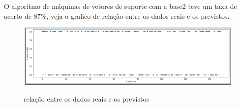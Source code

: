 O algoritmo de máquinas de vetores de suporte com a base2 teve um taxa de acerto de 87\%, veja o grafico de relação entre os dados reais e os previstos.
\begin{figure}[htbp]
	\begin{center}
		\includegraphics[width=0.7\linewidth]{imagens/SVMAPI.png}\\
	\end{center}
	\caption[relação entre os dados reais e os previstos]{relação entre os dados reais e os previstos}
	\label{fig:logo}
\end{figure}


